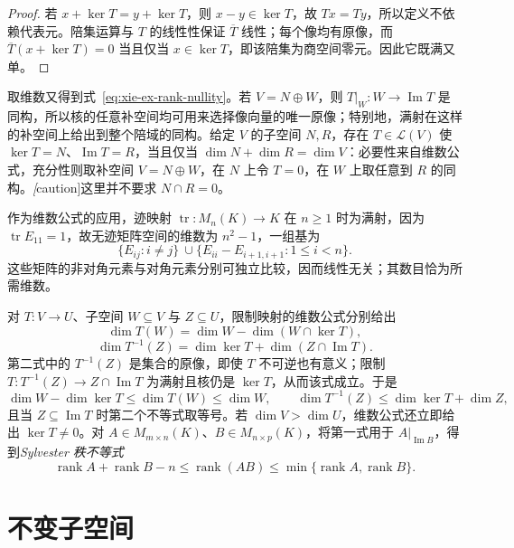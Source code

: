 \begin{proof}
若 $x+\ker T=y+\ker T$，则 $x-y\in\ker T$，故 $Tx=Ty$，所以定义不依赖代表元。陪集运算与 $T$ 的线性性保证 $\overline T$ 线性；每个像均有原像，而 $\overline T(x+\ker T)=0$ 当且仅当 $x\in\ker T$，即该陪集为商空间零元。因此它既满又单。
\end{proof}

取维数又得到式~\eqref{eq:xie-ex-rank-nullity}。若 $V=N\oplus W$，则 $T|_W:W\to\operatorname{Im}T$ 是同构，所以核的任意补空间均可用来选择像向量的唯一原像；特别地，满射在这样的补空间上给出到整个陪域的同构。给定 $V$ 的子空间 $N,R$，存在 $T\in\mathcal L(V)$ 使 $\ker T=N$、$\operatorname{Im}T=R$，当且仅当 $\dim N+\dim R=\dim V$：必要性来自维数公式，充分性则取补空间 $V=N\oplus W$，在 $N$ 上令 $T=0$，在 $W$ 上取任意到 $R$ 的同构。\emph[caution]{这里并不要求 $N\cap R=0$。}

作为维数公式的应用，迹映射 $\operatorname{tr}:M_n(K)\to K$ 在 $n\geq1$ 时为满射，因为 $\operatorname{tr}E_{11}=1$，故无迹矩阵空间的维数为 $n^2-1$，一组基为
\[
    \{E_{ij}:i\ne j\}\ \cup
    \{E_{ii}-E_{i+1,i+1}:1\leq i<n\}.
\]
这些矩阵的非对角元素与对角元素分别可独立比较，因而线性无关；其数目恰为所需维数。

对 $T:V\to U$、子空间 $W\subseteq V$ 与 $Z\subseteq U$，限制映射的维数公式分别给出
\begin{equation}
\label{eq:xie-ex-restriction-dimension}
    \dim T(W)=\dim W-\dim(W\cap\ker T),
\end{equation}
\begin{equation}
\label{eq:xie-ex-preimage-dimension}
    \dim T^{-1}(Z)=\dim\ker T+\dim(Z\cap\operatorname{Im}T).
\end{equation}
第二式中的 $T^{-1}(Z)$ 是集合的原像，即使 $T$ 不可逆也有意义；限制 $T:T^{-1}(Z)\to Z\cap\operatorname{Im}T$ 为满射且核仍是 $\ker T$，从而该式成立。于是
\[
    \dim W-\dim\ker T\leq\dim T(W)\leq\dim W,
    \qquad \dim T^{-1}(Z)\leq\dim\ker T+\dim Z,
\]
且当 $Z\subseteq\operatorname{Im}T$ 时第二个不等式取等号。若 $\dim V>\dim U$，维数公式还立即给出 $\ker T\ne0$。对 $A\in M_{m\times n}(K)$、$B\in M_{n\times p}(K)$，将第一式用于 $A|_{\operatorname{Im}B}$，得到\emph{Sylvester 秩不等式}
\begin{equation}
\label{eq:xie-ex-sylvester-rank}
    \operatorname{rank}A+\operatorname{rank}B-n
    \leq\operatorname{rank}(AB)
    \leq\min\{\operatorname{rank}A,\operatorname{rank}B\}.
\end{equation}

\section{不变子空间}
\label{sec:xie-ex-invariant-subspaces}

